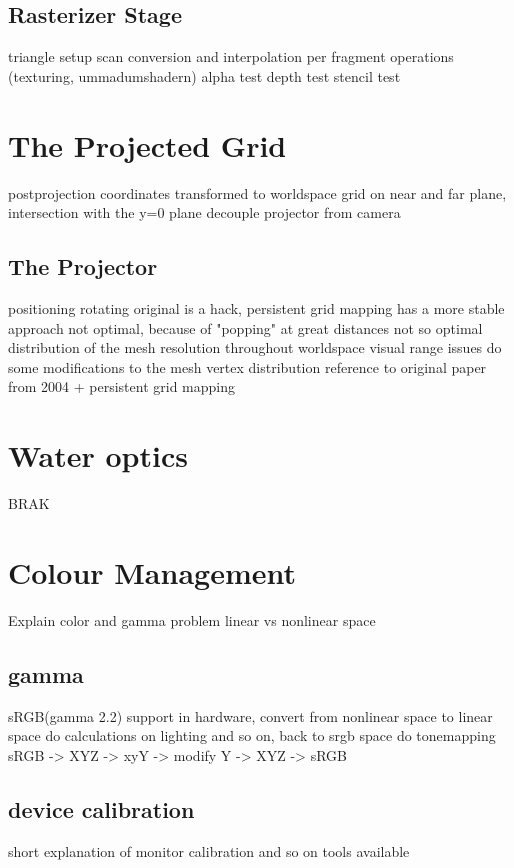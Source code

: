 \subsection{Rasterizer Stage}

triangle setup
scan conversion and interpolation
per fragment operations (texturing, ummadumshadern)
alpha test
depth test
stencil test

\section{The Projected Grid}

postprojection coordinates transformed to worldspace
grid on near and far plane, intersection with the y=0 plane
decouple projector from camera

\subsection{The Projector}
positioning
rotating
original is a hack, persistent grid mapping has a more stable approach
not optimal, because of "popping" at great distances
not so optimal distribution of the mesh resolution throughout worldspace
visual range issues
do some modifications to the mesh vertex distribution
reference to original paper from 2004 + persistent grid mapping

\section{Water optics}
BRAK

\section{Colour Management}

Explain color and gamma problem
linear vs nonlinear space

\subsection{gamma}
sRGB(gamma 2.2) support in hardware, convert from nonlinear space to linear
space do calculations on lighting and so on, back to srgb space
do tonemapping sRGB -> XYZ -> xyY -> modify Y -> XYZ -> sRGB

\subsection{device calibration}
short explanation of monitor calibration and so on
tools available


